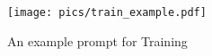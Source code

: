 

\begin{figure}
    \centering
    \texttt{[image: pics/train\_example.pdf]}
    \vspace{-7pt}
    \caption{An example prompt 
    for Training
    }
    \label{fig:training}
    \vspace{-10pt}
\end{figure}